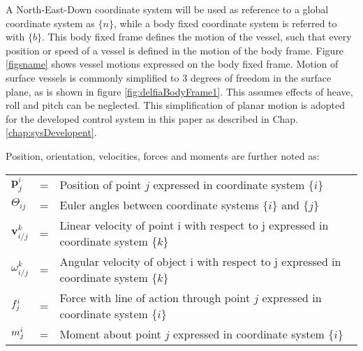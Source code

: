 A North-East-Down coordinate system will be used as reference to a global coordinate system as $\{n\}$, while a body fixed coordinate system is referred to with $\{b\}$. This body fixed frame defines the motion of the vessel, such that every position or speed of a vessel is defined in the motion of the body frame. Figure \ref{figsname} shows vessel motions expressed on the body fixed frame. Motion of surface vessels is commonly simplified to 3 degrees of freedom in the surface plane, as is shown in figure \ref{fig:delfiaBodyFrame1}. This assumes effects of heave, roll and pitch can be neglected. This simplification of planar motion is adopted for the developed control system in this paper as described in Chap. \ref{chap:sysDevelopent}. 

\begin{figure}[h!]
	\centering
\end{figure}

Position, orientation, velocities, forces and moments are further noted as:
\begin{table}[H]
\centering
\begin{tabular}{lll}
		$\textbf{p}^{i}_{j} $ 			& = &  	Position of point $j$ expressed in coordinate system $\{i\}$ \\[5pt]
		$\Theta_{ij}$ 					& = & 	Euler angles between coordinate systems $\{i\}$ and $\{j\}$ \\[5pt]
		$ \textbf{v}^{k}_{i/j}$   		& = & 	Linear velocity of point i with respect to j expressed in coordinate system $\{k\}$ \\[5pt]
		$ \omega^{k}_{i/j}$   			& = &	Angular velocity of object i with respect to j expressed in coordinate system $\{k\}$  \\[5pt]
		$\boldmath{f}^{i}_{j} $ 	   	& = &	Force with line of action through point $j$ expressed in coordinate system $\{i\}$ \\[5pt]
		$\boldmath{m}^{i}_{j} $   		& = & 	Moment about point $j$ expressed in coordinate system $\{i\}$
\end{tabular}
\end{table}

